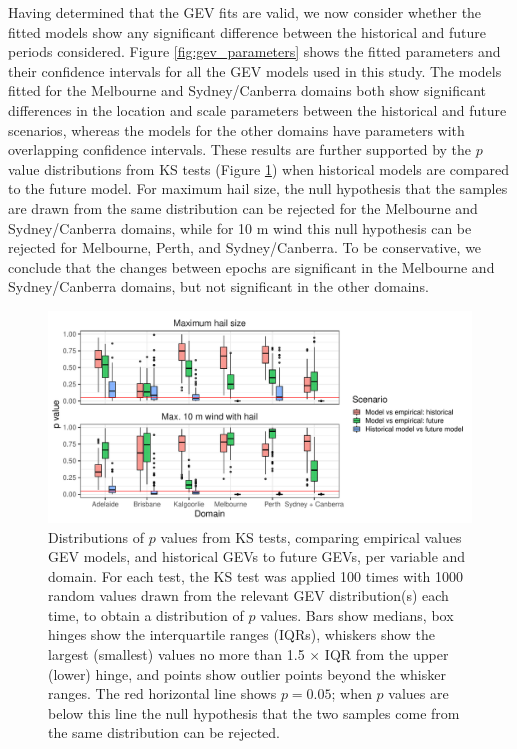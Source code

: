\documentclass[]{agujournal2019}\usepackage[]{graphicx}\usepackage[]{xcolor}
\begin{document}
Having determined that the GEV fits are valid, we now consider whether the fitted models show any significant difference between the historical and future periods considered. Figure \ref{fig:gev_parameters} shows the fitted parameters and their confidence intervals for all the GEV models used in this study. The models fitted for the Melbourne and Sydney/Canberra domains both show significant differences in the location and scale parameters between the historical and future scenarios, whereas the models for the other domains have parameters with overlapping confidence intervals. These results are further supported by the $p$ value distributions from KS tests (Figure \ref{fig:ks_pvals}) when historical models are compared to the future model. For maximum hail size, the null hypothesis that the samples are drawn from the same distribution can be rejected for the Melbourne and Sydney/Canberra domains, while for 10 m wind this null hypothesis can be rejected for Melbourne, Perth, and Sydney/Canberra. To be conservative, we conclude that the changes between epochs are significant in the Melbourne and Sydney/Canberra domains, but not significant in the other domains.

\begin{figure}[!ht]
      \includegraphics[width=\textwidth]{figures/fit_pvals}
      \caption{Distributions of $p$ values from KS tests, comparing empirical values GEV models, and historical GEVs to future GEVs, per variable and domain. For each test, the KS test was applied 100 times with 1000 random values drawn from the relevant GEV distribution(s) each time, to obtain a distribution of $p$ values. Bars show medians, box hinges show the interquartile ranges (IQRs), whiskers show the largest (smallest) values no more than 1.5 $\times$ IQR from the upper (lower) hinge, and points show outlier points beyond the whisker ranges. The red horizontal line shows $p = 0.05$; when $p$ values are below this line the null hypothesis that the two samples come from the same distribution can be rejected.}
      \label{fig:ks_pvals}
\end{figure}
\end{document}
